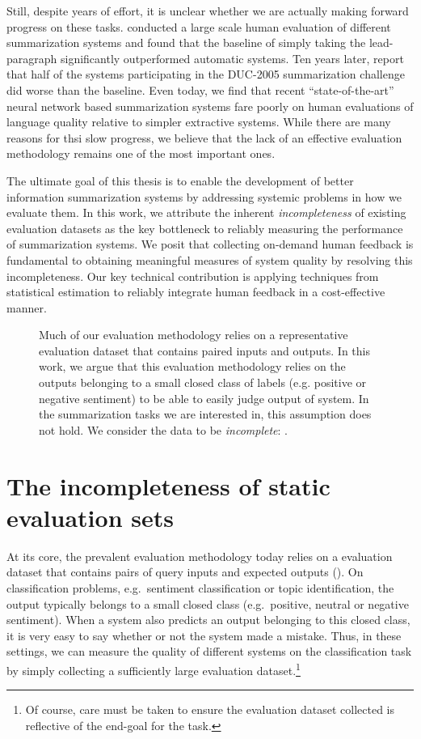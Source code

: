 Still, despite years of effort, it is unclear whether we are actually making forward progress on these tasks.
\citet{brandow1995automatic} conducted a large scale human evaluation of different summarization systems and found that the baseline of simply taking the lead-paragraph significantly outperformed automatic systems. 
Ten years later, \citet{passonneau2005applying} report that half of the systems participating in the DUC-2005 summarization challenge did worse than the baseline.
Even today, we find that recent ``state-of-the-art'' neural network based summarization systems fare poorly on human evaluations of language quality relative to simpler extractive systems.
While there are many reasons for thsi slow progress, we believe that the lack of an effective evaluation methodology remains one of the most important ones.

The ultimate goal of this thesis is to enable the development of better information summarization systems by addressing systemic problems in how we evaluate them.
In this work, we attribute the inherent \textit{incompleteness} of existing evaluation datasets as the key bottleneck to reliably measuring the performance of summarization systems.
We posit that collecting on-demand human feedback is fundamental to obtaining meaningful measures of system quality by resolving this incompleteness.
Our key technical contribution is applying techniques from statistical estimation to reliably integrate human feedback in a cost-effective manner.

\begin{figure}
  \caption[Complete and incomplete evaluation sets]{\label{fig:intro:evaluation-data} 
  Much of our evaluation methodology relies on a representative evaluation dataset that contains paired inputs and outputs.
  In this work, we argue that this evaluation methodology relies on the outputs belonging to a small closed class of labels (e.g. positive or negative sentiment) to be able to easily judge output of system.
  In the summarization tasks we are interested in, this assumption does not hold.
  We consider the data to be \textit{incomplete}: .
  }
\end{figure}
\section{The incompleteness of static evaluation sets}
At its core, the prevalent evaluation methodology today relies on a evaluation dataset that contains pairs of query inputs and expected outputs ().
On classification problems, e.g.\ sentiment classification or topic identification, the output typically belongs to a small closed class (e.g.\ positive, neutral or negative sentiment).
When a system also predicts an output belonging to this closed class, it is very easy to say whether or not the system made a mistake.
Thus, in these settings, we can measure the quality of different systems on the classification task by simply collecting a sufficiently large evaluation dataset.\footnote{%
Of course, care must be taken to ensure the evaluation dataset collected is reflective of the end-goal for the task.}

